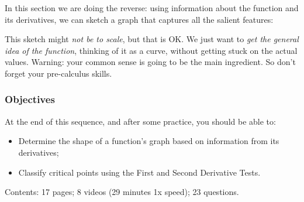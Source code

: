\documentclass[pdftex, brazil, 12pt, twoside]{article}
\begin{document}
In this section we are doing the reverse: using information about the function and
its derivatives, we can sketch a graph that captures all the salient features:

\begin{figure}[H]
  \begin{center}
  \end{center}
\end{figure}

This sketch might \emph{not be to scale}, but that is OK.
We just want to \emph{get the general idea of the function}, thinking
of it as a curve, without getting
stuck on the actual values.
Warning: your common sense is going to be the main ingredient.
So don't forget your pre-calculus skills.

\subsubsection{Objectives}
\label{u4-graphing-1st-2st-obj}

At the end of this sequence, and after some practice, you should be able to:

\begin{itemize}[noitemsep]
\item Determine the shape of a function's graph based on information from its derivatives;
\item Classify critical points using the First and Second Derivative Tests. 
\end{itemize}

Contents: 17 pages; 8 videos (29 minutes 1x speed); 23 questions.
\end{document}
